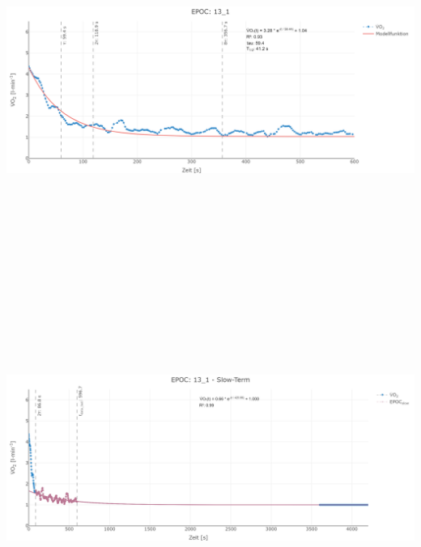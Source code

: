 \documentclass[
  letterpaper,
  DIV=11]{scrartcl}
\begin{document}
\includegraphics[width=11.45833in,height=4.6875in]{images/13_1_tau.png}
\includegraphics[width=11.45833in,height=4.6875in]{images/13_1_slow.png}
\end{document}

